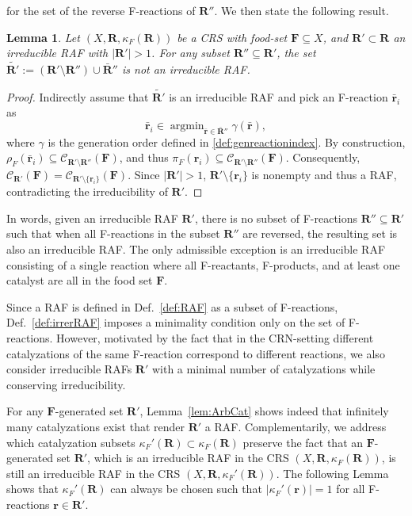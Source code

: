 \documentclass[pdflatex]{sn-jnl}
\theoremstyle{thmstyleone}%
\newtheorem{lemma}[theorem]{Lemma}%
\theoremstyle{examplesty}%
\theoremstyle{thmstylethree}%
\newcommand{\food}{\ensuremath{\mathbf{F}}}
\newcommand{\closure}[2]{\mathscr{C}_{#1}(#2)}
\newcommand{\FR}[0]{\mathbf{R}}
\newcommand{\fr}[0]{\mathbf{r}}
\newcommand{\RAF}[0]{\mathbf{R}'}
\newcommand{\cat}{\kappa_F}
\begin{document}
  for the set of the reverse F-reactions of $\RAF'$. We then state the following result.
\vspace{6pt}
\begin{lemma}\label{lem:noReverseIrrRAF}
Let $(X,\FR,\cat(\FR))$ be a CRS with food-set $\food\subseteq X$, and $\RAF \subset \FR$ 
an irreducible RAF with $|\RAF|>1$. For any subset $\RAF' \subseteq \RAF$, the set 
$\widetilde{\RAF}:=(\RAF \setminus \RAF') \cup \bar{\FR}''$ is not an irreducible RAF.
\end{lemma}
\begin{proof}
Indirectly assume that $\widetilde{\RAF}$ is an irreducible RAF and pick an F-reaction $\bar{\fr}_i$ as
\[\bar{\fr}_i\in
\operatorname{argmin}_{\bar{\fr}\in\bar{\FR}''}\gamma(\bar{\fr}),\]
where $\gamma$ is the generation order defined in \eqref{def:genreactionindex}.
By construction, $\rho_F(\bar{\fr}_i)\subseteq \closure{\RAF \setminus \RAF'}{\food}$, 
and thus $\pi_F(\fr_i)\subseteq \closure{\RAF \setminus \RAF'}{\food}$. Consequently, 
$\closure{\RAF}{\food}=\closure{\RAF \setminus \{\fr_i\}}{\food}$. Since $|\RAF|>1$, 
$\RAF\setminus\{\fr_i\}$ is nonempty and thus a RAF, contradicting the irreducibility of $\RAF$.
\end{proof}

In words, given an irreducible RAF $\RAF$, there is no subset of F-reactions $\RAF' \subseteq \RAF$ 
such that when all F-reactions in the subset $\RAF'$ are reversed, the resulting set is also an irreducible 
RAF. The only admissible exception is an irreducible RAF consisting of a single reaction where all 
F-reactants, F-products, and at least one catalyst are all in the food set $\food$.

Since a RAF is defined in Def.~\ref{def:RAF} as a subset of F-reactions,
Def.~\ref{def:irrerRAF} imposes a minimality condition only on the set of
F-reactions. However, motivated by the fact that in the CRN-setting
different catalyzations of the same F-reaction correspond to different
reactions, we also consider irreducible RAFs $\RAF$ with a minimal number
of catalyzations while conserving irreducibility.

For any $\food$-generated set $\RAF$, Lemma~\ref{lem:ArbCat} shows indeed
that infinitely many catalyzations exist that render $\RAF$ a
RAF. Complementarily, we address which catalyzation subsets
$\cat'(\FR)\subset \cat(\FR)$ preserve the fact that an $\food$-generated
set $\RAF$, which is an irreducible RAF in the CRS $(X,\FR, \cat(\FR))$, is
still an irreducible RAF in the CRS $(X,\FR, \cat'(\FR))$.  The following
Lemma shows that $\cat'(\FR)$ can always be chosen such that
$|\cat'(\fr)|=1$ for all F-reactions $\fr\in \RAF$.
\end{document}
